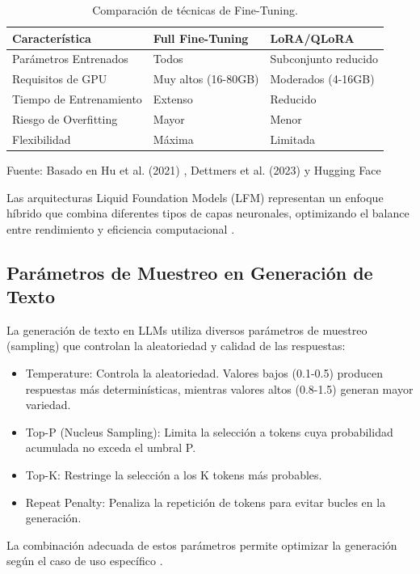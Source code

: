 \begin{table}[H]
\centering
\begin{tabularx}{\linewidth}{p{3.5cm} p{4.5cm} p{4.5cm}}
\toprule
Característica & Full Fine-Tuning & LoRA/QLoRA \\
\midrule
Parámetros Entrenados & Todos & Subconjunto reducido \\
Requisitos de GPU & Muy altos (16-80GB) & Moderados (4-16GB) \\
Tiempo de Entrenamiento & Extenso & Reducido \\
Riesgo de Overfitting & Mayor & Menor \\
Flexibilidad & Máxima & Limitada \\
\bottomrule
\end{tabularx}
\caption{Comparación de técnicas de Fine-Tuning.}\label{tab:finetuning_comparison}
Fuente: Basado en Hu et al. (2021) \cite{lora_paper}, Dettmers et al. (2023) \cite{qlora_paper} y Hugging Face \cite{llm_finetuning}
\end{table}

Las arquitecturas Liquid Foundation Models (LFM) representan un enfoque híbrido que combina diferentes tipos de capas neuronales, optimizando el balance entre rendimiento y eficiencia computacional \cite{liquidai_lfm}.

\subsection{Parámetros de Muestreo en Generación de Texto}
La generación de texto en LLMs utiliza diversos parámetros de muestreo (sampling) que controlan la aleatoriedad y calidad de las respuestas:

\begin{itemize}
    \item Temperature: Controla la aleatoriedad. Valores bajos (0.1-0.5) producen respuestas más determinísticas, mientras valores altos (0.8-1.5) generan mayor variedad.
    \item Top-P (Nucleus Sampling): Limita la selección a tokens cuya probabilidad acumulada no exceda el umbral P.
    \item Top-K: Restringe la selección a los K tokens más probables.
    \item Repeat Penalty: Penaliza la repetición de tokens para evitar bucles en la generación.
\end{itemize}

La combinación adecuada de estos parámetros permite optimizar la generación según el caso de uso específico \cite{holtzman2020curious}.

